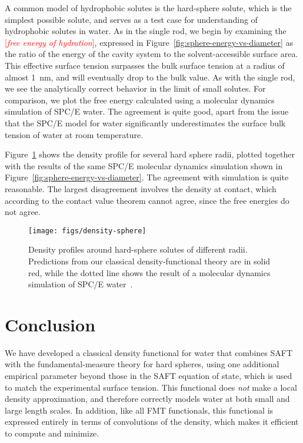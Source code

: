 \documentclass[letterpaper,twocolumn,amsmath,amssymb,prb]{revtex4-1}
\newcommand{\fixme}[1]{\textcolor{red}{[\emph{#1}]}}
\begin{document}
A common model of hydrophobic solutes is the hard-sphere solute, which
is the simplest possible solute, and serves as a test case for
understanding of hydrophobic solutes in
water\cite{sedlmeier2011entropy}.  As in the single rod, we begin by
examining the \fixme{free energy of hydration}, expressed in
Figure~\ref{fig:sphere-energy-vs-diameter} as the ratio of the energy
of the cavity system to the solvent-accessible surface area.  This
effective surface tension surpasses the bulk surface tension at a
radius of almost 1~nm, and will eventually drop to the bulk value.  As
with the single rod, we see the analytically correct behavior in the
limit of small solutes.  For comparison, we plot the free energy
calculated using a molecular dynamics simulation of SPC/E
water\cite{huang2001shs}.  The agreement is quite good, apart from the
issue that the SPC/E model for water significantly underestimates the
surface bulk tension of water at room
temperature\cite{vega2007surface}.

Figure~\ref{fig:density-sphere} shows the density profile for several
hard sphere radii, plotted together with the results of the same
SPC/E molecular dynamics simulation shown in
Figure~\ref{fig:sphere-energy-vs-diameter}\cite{huang2001shs}.  The
agreement with simulation is quite reasonable.  The largest
disagreement involves the density at contact, which according to the
contact value theorem cannot agree, since the free energies do not
agree.

\begin{figure}
\begin{center}
\texttt{[image: figs/density-sphere]}
\end{center}
\caption{ Density profiles around hard-sphere solutes of different radii. Predictions
  from our classical density-functional theory are in solid red, while
  the dotted line shows the result of a molecular dynamics simulation
  of SPC/E water~\cite{huang2001shs}.  }
\label{fig:density-sphere}
\end{figure}

\section{Conclusion}

We have developed a classical density functional for water that
combines SAFT with the fundamental-measure theory for hard spheres,
using one additional empirical parameter beyond those in the SAFT
equation of state, which is used to match the experimental surface
tension.  This functional does \emph{not} make a local density
approximation, and therefore correctly models water at both small and
large length scales.  In addition, like all FMT functionals, this
functional is expressed entirely in terms of convolutions of the
density, which makes it efficient to compute and minimize.
\end{document}
